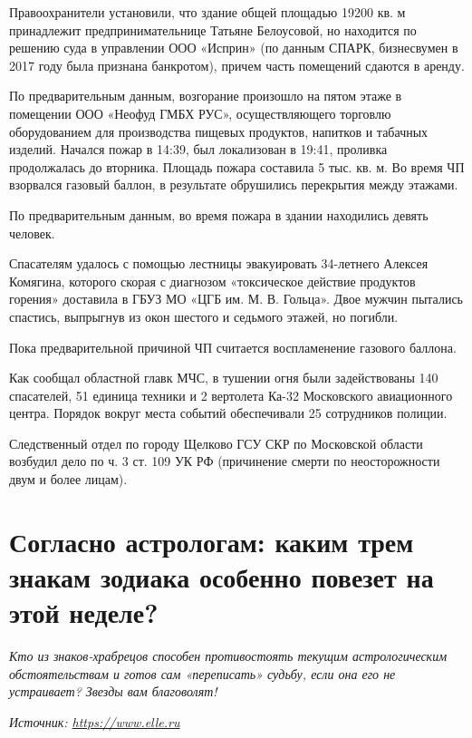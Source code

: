 Правоохранители установили, что здание общей площадью 19200 кв. м принадлежит предпринимательнице Татьяне Белоусовой, но находится по решению суда в управлении ООО «Исприн» (по данным СПАРК, бизнесвумен в 2017 году была признана банкротом), причем часть помещений сдаются в аренду.

По предварительным данным, возгорание произошло на пятом этаже в помещении ООО «Неофуд ГМБХ РУС», осуществляющего торговлю оборудованием для производства пищевых продуктов, напитков и табачных изделий. Начался пожар в 14:39, был локализован в 19:41, проливка продолжалась до вторника. Площадь пожара составила 5 тыс. кв. м. Во время ЧП взорвался газовый баллон, в результате обрушились перекрытия между этажами.

\begin{fancyquotes}
    По предварительным данным, во время пожара в здании находились девять человек.
\end{fancyquotes}

Спасателям удалось с помощью лестницы эвакуировать 34-летнего Алексея Комягина, которого скорая с диагнозом «токсическое действие продуктов горения» доставила в ГБУЗ МО «ЦГБ им. М. В. Гольца». Двое мужчин пытались спастись, выпрыгнув из окон шестого и седьмого этажей, но погибли.

Пока предварительной причиной ЧП считается воспламенение газового баллона.

Как сообщал областной главк МЧС, в тушении огня были задействованы 140 спасателей, 51 единица техники и 2 вертолета Ка-32 Московского авиационного центра. Порядок вокруг места событий обеспечивали 25 сотрудников полиции.

Следственный отдел по городу Щелково ГСУ СКР по Московской области возбудил дело по ч. 3 ст. 109 УК РФ (причинение смерти по неосторожности двум и более лицам).



\clearpage

\section[Каким знакам зодиака повезет]{Согласно астрологам: каким трем знакам зодиака особенно повезет на этой неделе?}

\textit{Кто из знаков-храбрецов способен противостоять текущим астрологическим обстоятельствам и готов сам «переписать» судьбу, если она его не устраивает? Звезды вам благоволят!}

\textit{Источник: \url{https://www.elle.ru}}

